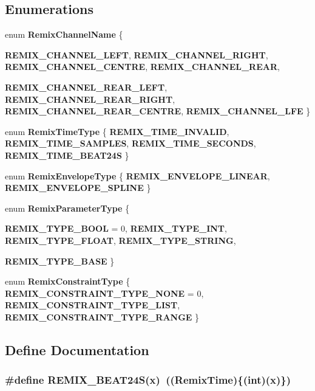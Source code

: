 \subsection*{Enumerations}
\begin{CompactItemize}
\item 
enum {\bf Remix\-Channel\-Name} \{ \par
{\bf REMIX\_\-CHANNEL\_\-LEFT}, 
{\bf REMIX\_\-CHANNEL\_\-RIGHT}, 
{\bf REMIX\_\-CHANNEL\_\-CENTRE}, 
{\bf REMIX\_\-CHANNEL\_\-REAR}, 
\par
{\bf REMIX\_\-CHANNEL\_\-REAR\_\-LEFT}, 
{\bf REMIX\_\-CHANNEL\_\-REAR\_\-RIGHT}, 
{\bf REMIX\_\-CHANNEL\_\-REAR\_\-CENTRE}, 
{\bf REMIX\_\-CHANNEL\_\-LFE}
 \}
\item 
enum {\bf Remix\-Time\-Type} \{ {\bf REMIX\_\-TIME\_\-INVALID}, 
{\bf REMIX\_\-TIME\_\-SAMPLES}, 
{\bf REMIX\_\-TIME\_\-SECONDS}, 
{\bf REMIX\_\-TIME\_\-BEAT24S}
 \}
\item 
enum {\bf Remix\-Envelope\-Type} \{ {\bf REMIX\_\-ENVELOPE\_\-LINEAR}, 
{\bf REMIX\_\-ENVELOPE\_\-SPLINE}
 \}
\item 
enum {\bf Remix\-Parameter\-Type} \{ \par
{\bf REMIX\_\-TYPE\_\-BOOL} =  0, 
{\bf REMIX\_\-TYPE\_\-INT}, 
{\bf REMIX\_\-TYPE\_\-FLOAT}, 
{\bf REMIX\_\-TYPE\_\-STRING}, 
\par
{\bf REMIX\_\-TYPE\_\-BASE}
 \}
\item 
enum {\bf Remix\-Constraint\-Type} \{ {\bf REMIX\_\-CONSTRAINT\_\-TYPE\_\-NONE} =  0, 
{\bf REMIX\_\-CONSTRAINT\_\-TYPE\_\-LIST}, 
{\bf REMIX\_\-CONSTRAINT\_\-TYPE\_\-RANGE}
 \}
\end{CompactItemize}


\subsection{Define Documentation}
\subsubsection{\setlength{\rightskip}{0pt plus 5cm}\#define REMIX\_\-BEAT24S(x)\ (({\bf Remix\-Time})\{(int)(x)\})}\label{remix__types_8h_a22}


